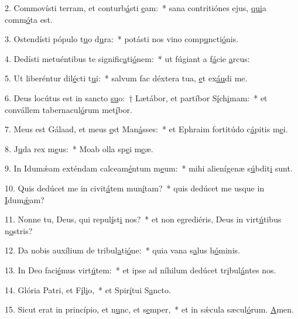 2. Commovísti terram, et conturb\uline{á}sti \uline{e}am:~* sana contritiónes ejus, \uline{qui}a comm\uline{ó}ta est.\par 
3. Ostendísti pópulo t\uline{u}o d\uline{u}ra:~* potásti nos vino comp\uline{u}ncti\uline{ó}nis.\par 
4. Dedísti metuéntibus te signific\uline{a}ti\uline{ó}nem:~* ut fúgiant a f\uline{á}cie \uline{a}rcus:\par 
5. Ut liberéntur dil\uline{é}cti t\uline{u}i:~* salvum fac déxtera tua, \uline{e}t ex\uline{áu}di me.\par 
6. Deus locútus est in sancto \uline{su}o:~† Lætábor, et partíbor S\uline{í}ch\uline{i}mam:~* et convállem tabernacul\uline{ó}rum met\uline{í}bor.\par 
7. Meus est Gálaad, et meus \uline{e}st Man\uline{á}sses:~* et Ephraim fortitúdo c\uline{á}pitis m\uline{e}i.\par 
8. J\uline{u}da rex m\uline{e}us:~* Moab olla sp\uline{e}i m\uline{e}æ.\par 
9. In Idumǽam exténdam calceam\uline{é}ntum m\uline{e}um:~* mihi alienígenæ s\uline{ú}bdit\uline{i} sunt.\par 
10. Quis dedúcet me in civit\uline{á}tem mun\uline{í}tam?~* quis dedúcet me usque in \uline{I}dum\uline{ǽ}am?\par 
11. Nonne tu, Deus, qui repul\uline{í}st\uline{i} nos?~* et non egrediéris, Deus in virt\uline{ú}tibus n\uline{o}stris?\par 
12. Da nobis auxílium de tribul\uline{a}ti\uline{ó}ne:~* quia vana s\uline{a}lus h\uline{ó}minis.\par 
13. In Deo faci\uline{é}mus virt\uline{ú}tem:~* et ipse ad níhilum dedúcet tr\uline{i}bul\uline{á}ntes nos.\par 
14. Glória Patri, et F\uline{í}l\uline{i}o,~* et Spir\uline{í}tui S\uline{a}ncto.\par 
15. Sicut erat in princípio, et n\uline{u}nc, et s\uline{e}mper,~* et in sǽcula sæcul\uline{ó}rum. \uline{A}men.\par 

